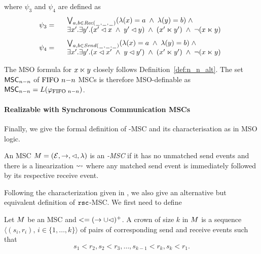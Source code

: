\noindent where $\psi_3$ and $\psi_4$ are defined as 
\[
	\psi_3 =
	\begin{array}{rl}
		& \bigvee_{\substack{a,b \in {\mathit{Rec}(\hspace{0.1em}\underline{\hspace{0.5em}}\hspace{0.1em},\hspace{0.1em}\underline{\hspace{0.5em}}\hspace{0.1em},\hspace{0.1em}\underline{\hspace{0.5em}}\hspace{0.1em})}}}
		  (\lambda(x) = a \;\wedge\; \lambda(y) = b)
		  \;\wedge\; \\
		& \exists x'.\exists y'.(x' \lhd x \;\wedge\; y' \lhd y) \;\wedge\; (x' \ltimes y') \;\wedge\; \neg(x \ltimes y)\\
	\end{array}
\]
\[
	\psi_4 =
	\begin{array}{rl}
		& \bigvee_{\substack{a,b \in {\mathit{Send}(\hspace{0.1em}\underline{\hspace{0.5em}}\hspace{0.1em},\hspace{0.1em}\underline{\hspace{0.5em}}\hspace{0.1em},\hspace{0.1em}\underline{\hspace{0.5em}}\hspace{0.1em})}}}
		  (\lambda(x) = a \;\wedge\; \lambda(y) = b)
		  \;\wedge\; \\
		& \exists x'.\exists y'.(x \lhd x' \;\wedge\; y \lhd y') \;\wedge\; (x' \ltimes y') \;\wedge\; \neg(x \ltimes y)\\
	\end{array}
\]

The MSO formula for $x \ltimes y$ closely follows Definition~\ref{def:n_n_alt}. The set $\mathsf{MSC}_{n\mathsf{-}n}$ of $\text{FIFO } n\mathsf{-}n$ MSCs is therefore MSO-definable as $\mathsf{MSC}_{n\mathsf{-}n}=L(\varphi_{\text{FIFO } n\mathsf{-}n})$.




\paragraph{\bf Realizable with Synchronous Communication MSCs} Finally, we give the formal definition of  \rsc-MSC and its characterisation as in MSO logic.
\begin{definition}\label{def:rsc}
	An MSC $M = (\mathcal{E},\to,\lhd,\lambda)$ is an \emph{\rsc-MSC} if it has no unmatched send events and there is a linearization $\rightsquigarrow$ where any matched send event is immediately followed by its respective receive event.
\end{definition}

Following the characterization given in \cite[Theorem 4.4]{DBLP:journals/dc/Charron-BostMT96}, we also give an alternative but equivalent definition of $\mathtt{rsc}$-MSC. We first need to define



\begin{definition}
	Let $M$ be an MSC and $< = (\to \cup \lhd)^+$. A crown of size $k$ in $M$ is a sequence $\langle(s_i,r_i),\, i \in \{1,\dots,k\}\rangle$ of pairs of corresponding send and receive events such that
	\[
		s_1 < r_2, s_2 < r_3, \dots, s_{k-1} < r_k, s_k < r_1.
	\]
\end{definition}


